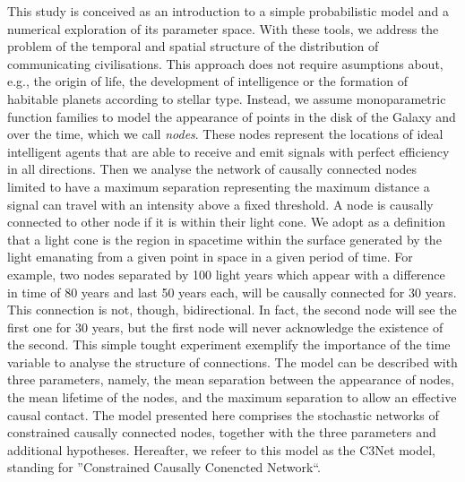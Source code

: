 \documentclass[crop]{CSLB}
\begin{document}

This study is conceived as an introduction to a simple probabilistic
model and a numerical exploration of its parameter space.
%
With these tools, we address the problem of the temporal and spatial structure of
the distribution of communicating civilisations.
%
This approach does not require asumptions about, e.g., the origin of life, the development of
intelligence or the formation of habitable planets according to stellar type.
%
Instead, we assume monoparametric function families to model the appearance of
points in the disk of the Galaxy and over the time, which we call
\textit{nodes}.
%
These nodes represent the locations of ideal intelligent agents that are able
to receive and emit signals with perfect efficiency in all directions.
%
Then we analyse the network of causally connected nodes limited to have a
maximum separation representing the maximum distance a signal can travel with
an intensity above a fixed threshold.
%
A node is causally connected to other node if it is within their light cone.
%
We adopt as a definition that a light cone is the region in spacetime within
the surface generated by the light emanating from a given point in space in a
given period of time.
%
For example, two nodes separated by 100 light years which appear with a
difference in time of 80 years and last 50 years each, will be causally
connected for 30 years.
%
This connection is not, though, bidirectional.
%
In fact, the second node will see the first one for 30 years, but the first
node will never acknowledge the existence of the second.
%
This simple tought experiment exemplify the importance of the time variable to
analyse the structure of connections.
%
The model can be described with three parameters, namely, the mean separation
between the appearance of nodes, the mean lifetime of the nodes, and the
maximum separation to allow an effective causal contact.
%
The model presented here comprises the stochastic networks of constrained
causally connected nodes, together with the three parameters and additional
hypotheses.
%
Hereafter, we refeer to this model as the C3Net model, standing for
''Constrained Causally Conencted Network``.
\end{document}
